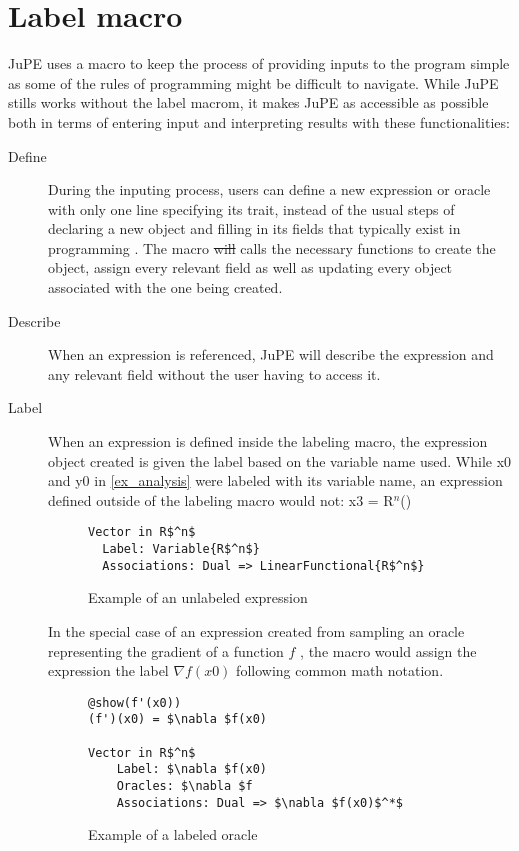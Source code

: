 \section{Label macro}
JuPE uses a macro to keep the process of providing inputs to the program simple as some of the  rules of programming might be difficult to navigate. While JuPE stills works without the label macrom, it makes JuPE as accessible as possible both in terms of entering input and interpreting results with these functionalities:
\begin{description}
	\item[Define] During the inputing process, users can define a new expression or oracle with only one line specifying its trait, instead of the usual steps of declaring a new object and filling in its fields that typically exist in programming . The macro \sout{will} calls the necessary functions to create the object, assign every relevant field as well as updating every object associated with the one being created.
	\item[Describe] When an expression is referenced, JuPE will describe the expression and any relevant field without the user having to access it. 
	\item[Label] When an expression is defined inside the labeling macro, the expression object created is given the label based on the variable name used.	While x0 and y0 in \ref{ex_analysis} were labeled with its variable name, an expression defined outside of the labeling macro would not:
	x3 = R$^n$() 
	\begin{figure}[!h]
		\begin{lstlisting}[mathescape]
Vector in R$^n$
  Label: Variable{R$^n$}
  Associations: Dual => LinearFunctional{R$^n$}
\end{lstlisting}
\caption{Example of an unlabeled expression}
\label{ex_unlabeled}
\end{figure}

	In the special case of an expression created from sampling an oracle representing the gradient of a function $f$ ,  the macro would assign the expression the label $\nabla f(x0)$ following common math notation.
	\begin{figure}[!h]
		\begin{lstlisting}[mathescape]
@show(f'(x0))
(f')(x0) = $\nabla $f(x0)

Vector in R$^n$
	Label: $\nabla $f(x0)
	Oracles: $\nabla $f
	Associations: Dual => $\nabla $f(x0)$^*$
		\end{lstlisting}
		\caption{Example of a labeled oracle}
		\label{ex_labeled}
	\end{figure}
\end{description}


